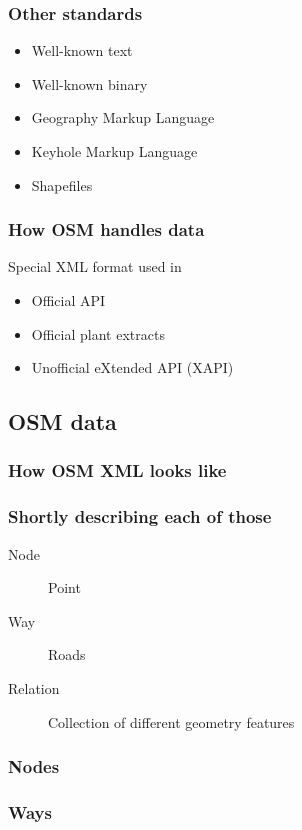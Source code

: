 \documentclass{beamer}
\begin{document}
\begin{frame}
  \frametitle{Other standards}
  \begin{itemize}
  \item Well-known text
  \item Well-known binary
  \item Geography Markup Language
  \item Keyhole Markup Language
  \item Shapefiles
  \end{itemize}
\end{frame}

\begin{frame}
  \frametitle{How OSM handles data}
  Special XML format used in
  \begin{itemize}
  \item Official API
  \item Official plant extracts
  \item Unofficial eXtended API (XAPI)
  \end{itemize}
\end{frame}

\subsection{OSM data}

\begin{frame}[fragile]
  \frametitle{How OSM XML looks like}
  
\end{frame}

\begin{frame}
  \frametitle{Shortly describing each of those}
  \begin{description}
  \item[Node] Point
  \item[Way] Roads
  \item[Relation] Collection of different geometry features
  \end{description}
\end{frame}

\begin{frame}
  \frametitle{Nodes}
  
\end{frame}

\begin{frame}
  \frametitle{Ways}
  
\end{frame}
\end{document}
